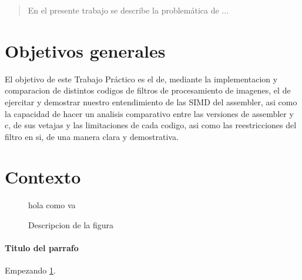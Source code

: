 \documentclass[a4paper]{article}
\begin{document}
\thispagestyle{empty}

\newpage

\thispagestyle{empty}
\vfill
\begin{abstract}
En el presente trabajo se describe la problemática de ...
\end{abstract}

\thispagestyle{empty}
\vspace{3cm}
\tableofcontents
\newpage


\newpage

\section{Objetivos generales}

El objetivo de este Trabajo Práctico es el de, mediante la implementacion y comparacion de distintos codigos de filtros de procesamiento de imagenes,  el de   ejercitar y demostrar nuestro entendimiento de las SIMD del assembler, asi como la capacidad de hacer un analisis comparativo entre las versiones de assembler y c, de sus vetajas y las limitaciones de cada  codigo, asi como las reestricciones del filtro en si, de una manera clara y demostrativa. 



\section{Contexto}

\begin{figure}
  \begin{center}
	\caption{Descripcion de la figura}
	\label{nombreparareferenciar}
	
	
	hola como va
  \end{center}
\end{figure}


\paragraph{\textbf{Titulo del parrafo} } Empezando
\ref{nombreparareferenciar}.
\end{document}
